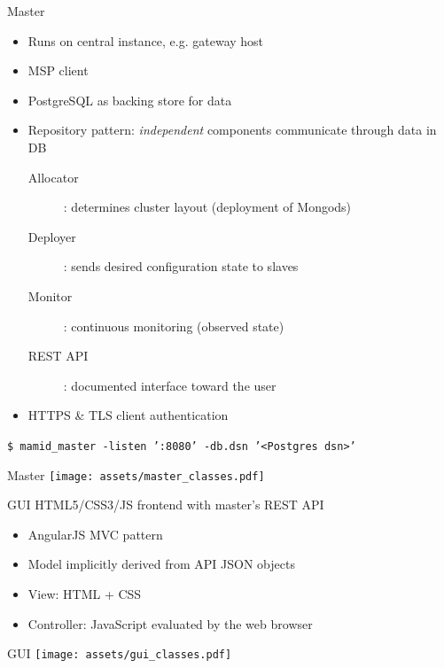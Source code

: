 \documentclass[11pt,aspectratio=169]{beamer}
\begin{document}
    \begin{frame}{Master}
        
        \begin{itemize}
            \item Runs on central instance, e.g. gateway host
            \item MSP client
            \item PostgreSQL as backing store for data
            \item Repository pattern: \textit{independent} components communicate through data in DB
            \begin{description}
                 \item[Allocator]: determines cluster layout (deployment of Mongods)
                 \item[Deployer]: sends desired configuration state to slaves
                 \item[Monitor]: continuous monitoring (observed state)
                 \item[REST API]: documented interface toward the user
            \end{description}
            \item HTTPS \& TLS client authentication
        \end{itemize}
        \vspace{15pt}
        \texttt{\$ mamid\_master -listen ':8080' -db.dsn '<Postgres dsn>'}
        
    \end{frame}
    \begin{frame}{Master}
        \texttt{[image: assets/master\_classes.pdf]}
    \end{frame}
    
    
    \begin{frame}{GUI}
           HTML5/CSS3/JS frontend with master's REST API
           \begin{itemize}
	           	\item AngularJS MVC pattern \pause
	           	\item Model implicitly derived from API JSON objects \pause
	           	\item View: HTML + CSS \pause
	           	\item Controller: JavaScript evaluated by the web browser
           \end{itemize}
    \end{frame}
    \begin{frame}{GUI}
        \texttt{[image: assets/gui\_classes.pdf]}
    \end{frame}
    
\end{document}
